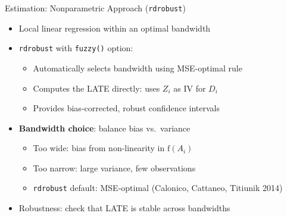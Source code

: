 \documentclass[hyperref={pdfpagelabels=false}]{beamer}
\begin{document}
\begin{frame}{Estimation: Nonparametric Approach (\texttt{rdrobust})}{}
	\begin{itemize}
		\item Local linear regression within an optimal bandwidth
		\vspace{0.2cm}
		\item \texttt{rdrobust} with \texttt{fuzzy()} option:
		\vspace{0.2cm}
		\begin{itemize}
			\item Automatically selects bandwidth using MSE-optimal rule
			\vspace{0.2cm}
			\item Computes the LATE directly: uses $Z_i$ as IV for $D_i$
			\vspace{0.2cm}
			\item Provides bias-corrected, robust confidence intervals
		\end{itemize}
		\vspace{0.2cm}
		\item \textbf{Bandwidth choice}: balance bias vs.\ variance
		\vspace{0.2cm}
		\begin{itemize}
			\item Too wide: bias from non-linearity in $\mathrm{f}(A_i)$
			\vspace{0.2cm}
			\item Too narrow: large variance, few observations
			\vspace{0.2cm}
			\item \texttt{rdrobust} default: MSE-optimal (Calonico, Cattaneo, Titiunik 2014)
		\end{itemize}
		\vspace{0.2cm}
		\item Robustness: check that LATE is stable across bandwidths
	\end{itemize}
\end{frame}
\end{document}

